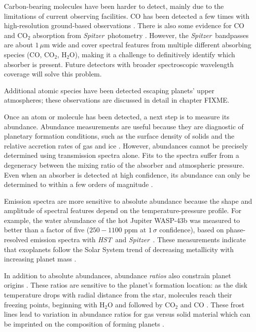 \documentclass[graybox,natbib,nosecnum]{svmult}
\newcommand{\project}[1]{\textsl{#1}}
\newcommand{\HST}{\project{HST}}
\newcommand{\Spitzer}{\project{Spitzer}}
\begin{document}
Carbon-bearing molecules have been harder to detect, mainly due to the limitations of current observing facilities. CO has been detected a few times with high-resolution ground-based observations \citep{dekok13,brogi14}.  There is also some evidence for CO and CO$_2$ absorption from \Spitzer\ photometry \citep[e.g.][]{desert09}. However, the \Spitzer\ bandpasses are about $1\,\mu$m wide and cover spectral features from multiple different absorbing species (CO, CO$_2$, H$_2$O), making it a challenge to definitively identify which absorber is present. Future detectors with broader spectroscopic wavelength coverage will solve this problem.

Additional atomic species have been detected escaping planets' upper atmospheres; these observations are discussed in detail in chapter FIXME. 

Once an atom or molecule has been detected, a next step is to measure its abundance. Abundance measurements are useful because they are diagnostic of planetary formation conditions, such as the surface density of solids and the relative accretion rates of gas and ice \citep[e.g.][]{fortney13, mordasini16}.  However, abundances cannot be precisely determined using transmission spectra alone. Fits to the spectra suffer from a degeneracy between the mixing ratio of the absorber and atmospheric pressure. Even when an absorber is detected at high confidence, its abundance can only be determined to within a few orders of magnitude \citep{benneke12, griffith13, kreidberg15b}. 

Emission spectra are more sensitive to absolute abundance because the shape and amplitude of spectral features depend on the temperature-pressure profile. For example, the water abundance of the hot Jupiter WASP-43b was measured to better than a factor of five  ($250 - 1100$ ppm at $1\,\sigma$ confidence), based on phase-resolved emission spectra with \HST\ and \Spitzer\ \citep{stevenson17}. These measurements indicate that exoplanets follow the Solar System trend of decreasing metallicity with increasing planet mass \citep{kreidberg14b, line16}.  
 
In addition to absolute abundances, abundance \emph{ratios} also constrain planet origins \citep{FIXME}. These ratios are sensitive to the planet's formation location: as the disk temperature drops with radial distance from the star, molecules reach their freezing points, beginning with H$_2$O and followed by CO$_2$ and CO \citep{oberg11}. These frost lines lead to variation in abundance ratios for gas versus solid material which can be imprinted on the composition of forming planets \citep{madhusudhan14, alidib16, mordasini16}.
\end{document}
